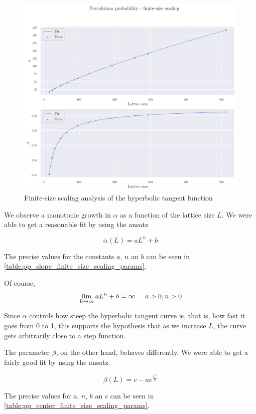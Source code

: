 \begin{figure}[H]
  \includegraphics[width=\linewidth]{Images/sim_perc_prob_param_scaling.png}
  \caption{Finite-size scaling analysis of the hyperbolic tangent function}
  \label{fig:sim_perc_prob_param_scaling.png}
\end{figure}

We observe a monotonic growth in $\alpha$ as a function of the lattice size $L$. We were able to get a reasonable fit by using the ansatz

$$ 
    \alpha(L) = a L^n + b
$$

The precise values for the constants $a$, $n$ an $b$ can be seen in \autoref{table:pp_slope_finite_size_scaling_params}.

Of course, 
$$ 
\lim_{L\to\infty} a L^n + b = \infty \hspace{0.5cm} a > 0, n>0
$$

Since $\alpha$ controls how steep the hyperbolic tangent curve is, that is, how fast it goes from 0 to 1, this supports the hypothesis that as we increase $L$, the curve gets arbitrarily close to a step function. 


The parameter $\beta$, on the other hand, behaves differently. We were able to get a fairly good fit by using the ansatz 

$$ 
\beta(L) = c - a e^{\frac{L^n}{b}}
$$ 

The precise values for $a$, $n$, $b$ an $c$ can be seen in \autoref{table:pp_center_finite_size_scaling_params}. 

